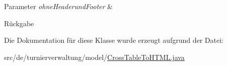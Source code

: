 \begin{DoxyParams}{Parameter}
{\em ohne\+Headerund\+Footer} & \\
\hline
\end{DoxyParams}
\begin{DoxyReturn}{Rückgabe}

\end{DoxyReturn}


Die Dokumentation für diese Klasse wurde erzeugt aufgrund der Datei\+:\begin{DoxyCompactItemize}
\item 
src/de/turnierverwaltung/model/\hyperlink{_cross_table_to_h_t_m_l_8java}{Cross\+Table\+To\+H\+T\+M\+L.\+java}\end{DoxyCompactItemize}
